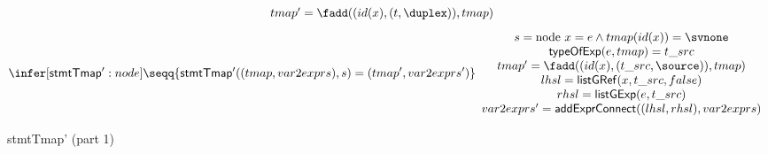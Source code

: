 {\begin{figure}[htbp]
\begin{gather*}
{\begin{array}{c}
      tmap' = \fadd((id(x), (t, \duplex)), tmap) 
     \end{array}
    }
   \quad
   \\[1ex]
    \infer[{\sf stmtTmap'}: node]
    {\seqq{{\sf stmtTmap'}((tmap, var2exprs), s) = (tmap', var2exprs')}}
    {
     \begin{array}{c}
      s = \mbox{node } x = e \wedge tmap(id(x)) = \svnone  \\
      {\sf typeOfExp}(e, tmap) = t\_src \\
      tmap' = \fadd((id(x), (t\_src, \source)), tmap) \\
      lhsl = {\sf listGRef} (x, t\_src, false) \\
      rhsl = {\sf listGExp} (e, t\_src)\\
      var2exprs' = {\sf addExprConnect} ((lhsl, rhsl),var2exprs )
     \end{array}
    }
\end{gather*}
  \caption{{\sf stmtTmap'} (part 1)}
  \label{fig:stmts-tmap'}
\end{figure}

}
